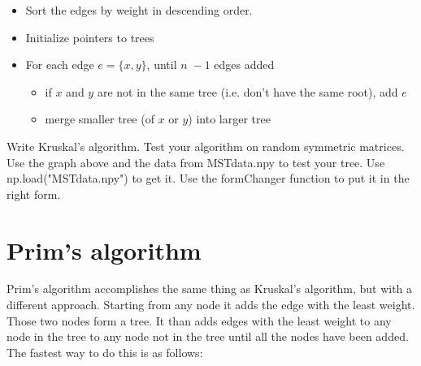 \begin{itemize}

\item Sort the edges by weight in descending order.

\item Initialize pointers to trees

\item For each edge $e=\{x, y\}$, until $n-1$ edges added  

\begin{itemize}

\item if $x$ and $y$ are not in the same tree (i.e. don’t have the same root), add $e$

\item merge smaller tree (of $x$ or $y$) into larger tree 

\end{itemize}

\end{itemize}

\begin{problem}
Write Kruskal's algorithm.
Test your algorithm on random symmetric matrices.
Use the graph above and the data from MSTdata.npy to test your tree.
Use np.load("MSTdata.npy") to get it.
Use the formChanger function to put it in the right form.
\end{problem}

\section*{Prim's algorithm}

Prim's algorithm accomplishes the same thing as Kruskal's algorithm, but with a different approach.
Starting from any node it adds the edge with the least weight.
Those two nodes form a tree.
It than adds edges with the least weight to any node in the tree to any node not in the tree until all the nodes have been added.
The fastest way to do this is as follows:

\flushleft

